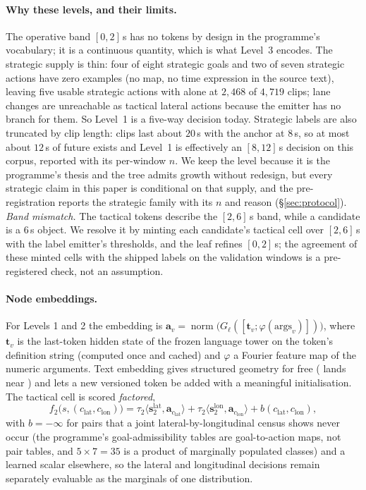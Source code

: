\paragraph{Why these levels, and their limits.}
The operative band $[0,2]$\,s has no tokens by design in the programme's vocabulary; it is a continuous quantity, which is what Level~3 encodes. The strategic supply is thin:
four of eight strategic goals and two of seven strategic actions have zero examples (no map, no time expression in the source text), leaving five usable strategic actions with
 alone at $2{,}468$ of $4{,}719$ clips\evI; lane changes are unreachable as tactical lateral actions because the emitter has no branch for them. So Level~1 is a five-way decision today. Strategic labels are also truncated by clip length: clips last about $20$\,s with the anchor at $8$\,s, so at most about $12$\,s of future exists and Level~1 is effectively an $[8,12]$\,s decision on this corpus, reported with its per-window $n$. We keep the level because it
is the programme's thesis and the tree admits growth without redesign, but every strategic claim in this paper is conditional on that supply, and the pre-registration reports the strategic family
with its $n$ and reason (\S\ref{sec:protocol}).
\emph{Band mismatch.} The tactical tokens describe the $[2,6]$\,s band, while a candidate is a $6$\,s object. We resolve it by minting each candidate's tactical cell over $[2,6]$\,s with the label emitter's thresholds, and the leaf refines $[0,2]$\,s; the agreement of these minted cells with the shipped labels on the validation windows is a pre-registered check, not an assumption.

\paragraph{Node embeddings.}
For Levels 1 and 2 the embedding is $\mathbf a_v=\operatorname{norm}\big(G_\ell([\mathbf t_v;\varphi(\text{args}_v)])\big)$, where $\mathbf t_v$ is the last-token hidden state of the frozen language tower on the token's definition string (computed once and cached) and
$\varphi$ a Fourier feature map of the numeric arguments. Text embedding gives structured geometry for free ( lands near ) and lets a new versioned token be added with a meaningful initialisation. The tactical cell is scored
\emph{factored},
\begin{equation}
f_2\big(s,(c_{\text{lat}},c_{\text{lon}})\big)=\tau_2\langle\mathbf s_2^{\text{lat}},\mathbf a_{c_{\text{lat}}}\rangle+\tau_2\langle\mathbf s_2^{\text{lon}},\mathbf a_{c_{\text{lon}}}\rangle+b(c_{\text{lat}},c_{\text{lon}}),
\end{equation}
with $b=-\infty$ for pairs that a joint lateral-by-longitudinal census shows never occur (the programme's goal-admissibility tables are goal-to-action maps, not pair tables, and $5\times7=35$ is a product of marginally populated classes) and a learned scalar elsewhere, so the lateral and longitudinal decisions remain separately evaluable as the marginals of one distribution.

